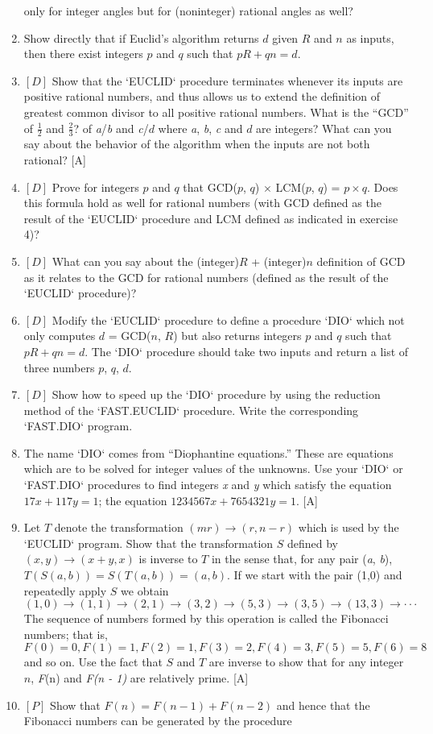 \documentclass{book}
\begin{document}
\begin{enumerate}
only for integer angles but for (noninteger) rational angles as well?
\item Show directly that if Euclid's algorithm returns $d$ given $R$ and $n$ as
inputs, then there exist integers $p$ and $q$ such that $pR + qn = d$.  
\item $[D]$ Show that the \textsc{`EUCLID`} procedure terminates whenever its inputs
are positive rational numbers, and thus allows us to extend the definition
of greatest common divisor to all positive rational numbers. What is the
``GCD'' of $\frac{1}{2}$ and $\frac{2}{3}$? of {\em a}/{\em b} and {\em c}/$d$ where {\em a}, {\em b}, {\em c} and $d$ are integers?
What can you say about the behavior of the algorithm when the inputs
are not both rational? [A]
\item $[D]$ Prove for integers $p$ and $q$ that GCD($p$, $q$) $\times$ LCM($p$, $q$) = $p \times q$. 
Does this formula hold as well for rational numbers (with GCD defined
as the result of the \textsc{`EUCLID`} procedure and LCM defined as indicated in
exercise 4)?
\item $[D]$ What can you say about the (integer)$R$ + (integer)$n$ definition
of GCD as it relates to the GCD for rational numbers (defined as the
result of the \textsc{`EUCLID`} procedure)?
\item $[D]$ Modify the \textsc{`EUCLID`} procedure to define a procedure \textsc{`DIO`} which
not only computes $d$ = GCD($n$, $R$) but also returns integers $p$ and $q$
such that $pR + qn = d$. The \textsc{`DIO`} procedure should take two inputs and
return a list of three numbers $p$, $q$, $d$.  
\item $[D]$ Show how to speed up the \textsc{`DIO`} procedure by using the reduction method of the \textsc{`FAST.EUCLID`} procedure. Write the corresponding
\textsc{`FAST.DIO`} program.  
\item The name \textsc{`DIO`} comes from ``Diophantine equations.'' These are
equations which are to be solved for integer values of the unknowns. Use
your \textsc{`DIO`} or \textsc{`FAST.DIO`} procedures to find integers {\em x} and {\em y} which satisfy
the equation $17x + 117y = 1$; the equation $1234567x + 7654321y = 1$. [A]
\item Let $T$ denote the transformation $(mr) \rightarrow (r, n - r)$ which is used
by the \textsc{`EUCLID`} program. Show that the transformation $S$ defined by
$(x, y) \rightarrow (x + y, x)$ is inverse to $T$ in the sense that, for any pair ({\em a}, {\em b}),
$T(S(a,b)) = S(T(a,b)) = (a, b)$. If we start with the pair (1,0) and
repeatedly apply $S$ we obtain
$$(1,0) \rightarrow (1, 1) \rightarrow (2,1) \rightarrow (3,2) \rightarrow (5,3) \rightarrow (3,5) \rightarrow (13,3) \rightarrow \cdot \cdot \cdot $$
\noindent The sequence of numbers formed by this operation is called the Fibonacci
numbers; that is,
$$F(0)=0,F(1)=1,F(2)=1,F(3)=2,F(4)=3,F(5)=5,F(6)=8$$
\noindent and so on. Use the fact that $S$ and $T$ are inverse to show that for any
integer $n$, {\em F}(n) and {\em F(n - 1)} are relatively prime. [A]
\item $[P]$ Show that $F(n) = F(n - 1) + F(n - 2)$ and hence that the
Fibonacci numbers can be generated by the procedure


\end{enumerate}
\end{document}

